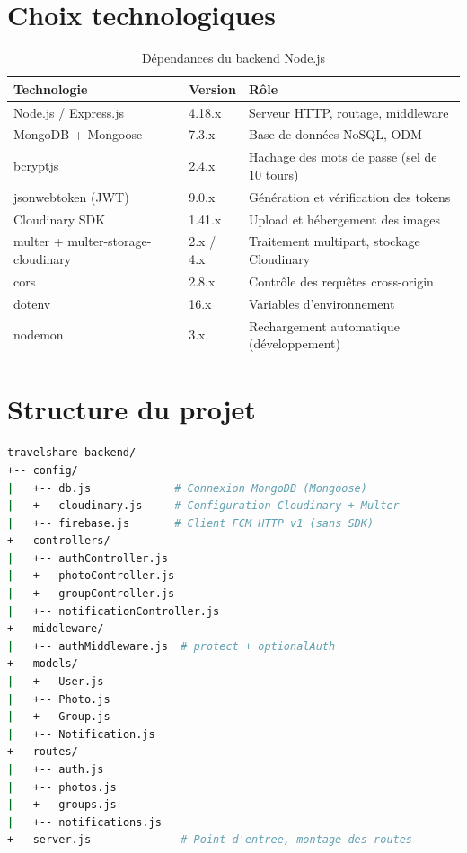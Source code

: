 \documentclass[12pt, a4paper, openany]{report}
\begin{document}
\section{Choix technologiques}

\begin{table}[H]
\centering
\caption{Dépendances du backend Node.js}
\renewcommand{\arraystretch}{1.3}
\begin{tabularx}{\textwidth}{llX}
\toprule
\rowcolor{primary!15}
\textbf{Technologie} & \textbf{Version} & \textbf{Rôle} \\
\midrule
Node.js / Express.js            & 4.18.x & Serveur HTTP, routage, middleware \\
MongoDB + Mongoose              & 7.3.x  & Base de données NoSQL, ODM \\
bcryptjs                        & 2.4.x  & Hachage des mots de passe (sel de 10 tours) \\
jsonwebtoken (JWT)              & 9.0.x  & Génération et vérification des tokens \\
Cloudinary SDK                  & 1.41.x & Upload et hébergement des images \\
multer + multer-storage-cloudinary & 2.x / 4.x & Traitement multipart, stockage Cloudinary \\
cors                            & 2.8.x  & Contrôle des requêtes cross-origin \\
dotenv                          & 16.x   & Variables d'environnement \\
nodemon                         & 3.x    & Rechargement automatique (développement) \\
\bottomrule
\end{tabularx}
\end{table}

\section{Structure du projet}

\begin{lstlisting}[language=bash, caption=Organisation du projet backend]
travelshare-backend/
+-- config/
|   +-- db.js             # Connexion MongoDB (Mongoose)
|   +-- cloudinary.js     # Configuration Cloudinary + Multer
|   +-- firebase.js       # Client FCM HTTP v1 (sans SDK)
+-- controllers/
|   +-- authController.js
|   +-- photoController.js
|   +-- groupController.js
|   +-- notificationController.js
+-- middleware/
|   +-- authMiddleware.js  # protect + optionalAuth
+-- models/
|   +-- User.js
|   +-- Photo.js
|   +-- Group.js
|   +-- Notification.js
+-- routes/
|   +-- auth.js
|   +-- photos.js
|   +-- groups.js
|   +-- notifications.js
+-- server.js              # Point d'entree, montage des routes
\end{lstlisting}
\end{document}
